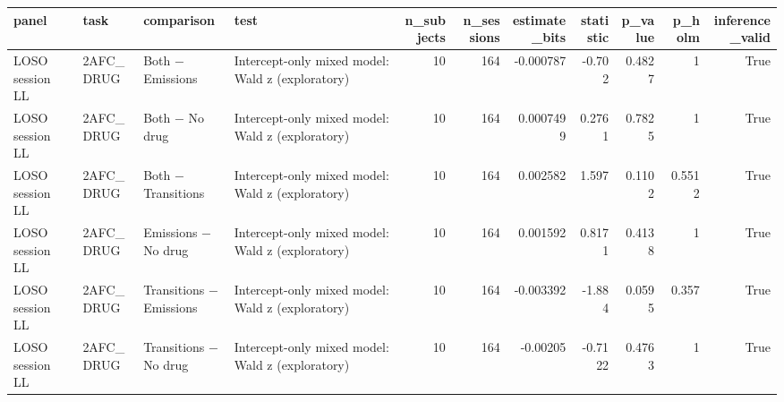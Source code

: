 \begin{tabular}{llllrrrrrrr}
\toprule
panel & task & comparison & test & n\_subjects & n\_sessions & estimate\_bits & statistic & p\_value & p\_holm & inference\_valid \\
\midrule
LOSO session LL & 2AFC\_DRUG & Both − Emissions & Intercept-only mixed model: Wald z (exploratory) & 10 & 164 & -0.000787 & -0.702 & 0.4827 & 1 & True \\
LOSO session LL & 2AFC\_DRUG & Both − No drug & Intercept-only mixed model: Wald z (exploratory) & 10 & 164 & 0.0007499 & 0.2761 & 0.7825 & 1 & True \\
LOSO session LL & 2AFC\_DRUG & Both − Transitions & Intercept-only mixed model: Wald z (exploratory) & 10 & 164 & 0.002582 & 1.597 & 0.1102 & 0.5512 & True \\
LOSO session LL & 2AFC\_DRUG & Emissions − No drug & Intercept-only mixed model: Wald z (exploratory) & 10 & 164 & 0.001592 & 0.8171 & 0.4138 & 1 & True \\
LOSO session LL & 2AFC\_DRUG & Transitions − Emissions & Intercept-only mixed model: Wald z (exploratory) & 10 & 164 & -0.003392 & -1.884 & 0.0595 & 0.357 & True \\
LOSO session LL & 2AFC\_DRUG & Transitions − No drug & Intercept-only mixed model: Wald z (exploratory) & 10 & 164 & -0.00205 & -0.7122 & 0.4763 & 1 & True \\
\bottomrule
\end{tabular}
